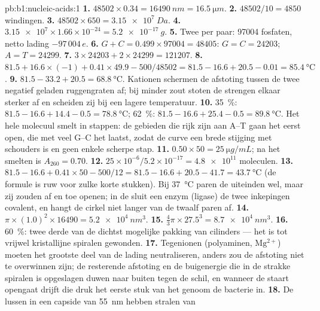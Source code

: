 \begin{solution}{pb:b1:nucleic-acids:1}
\textbf{1.} $\num{48502}\times 0.34 = \qty{16490}{nm} = \qty{16.5}{\micro m}$.
\textbf{2.} $\num{48502}/10 = 4850$ windingen.
\textbf{3.} $\num{48502}\times 650 = \qty{3.15e7}{Da}$.
\textbf{4.} $\num{3.15e7}\times 1.66\times 10^{-24} = \qty{5.2e-17}{g}$.
\textbf{5.} Twee per paar: \num{97004} fosfaten, netto lading $-97\,004\,e$.
\textbf{6.} $G + C = 0.499\times\num{97004} = \num{48405}$: $G = C =
\num{24203}$; $A = T = \num{24299}$.
\textbf{7.} $3\times\num{24203} + 2\times\num{24299} = \num{121207}$.
\textbf{8.} $81.5 + 16.6\times(-1) + 0.41\times 49.9 - 500/48502 =
81.5 - 16.6 + 20.5 - 0.01 = \qty{85.4}{\celsius}$.
\textbf{9.} $81.5 - 33.2 + 20.5 = \qty{68.8}{\celsius}$. Kationen schermen de
afstoting tussen de twee negatief geladen ruggengraten af; bij minder zout stoten
de strengen elkaar sterker af en scheiden zij bij een lagere temperatuur.
\textbf{10.} \qty{35}{\%}: $81.5 - 16.6 + 14.4 - 0.5 =
\qty{78.8}{\celsius}$; \qty{62}{\%}: $81.5 - 16.6 + 25.4 - 0.5 =
\qty{89.8}{\celsius}$. Het hele molecuul smelt in stappen: de gebieden die rijk
zijn aan A--T gaan het eerst open, die met veel G--C het laatst, zodat de curve
een brede stijging met schouders is en geen enkele scherpe stap.
\textbf{11.} $0.50\times 50 = \qty{25}{\micro g/mL}$; na het smelten is
$A_{260} = 0.70$.
\textbf{12.} $25\times 10^{-6}/5.2\times 10^{-17} = \num{4.8e11}$ moleculen.
\textbf{13.} $81.5 - 16.6 + 0.41\times 50 - 500/12 = 81.5 - 16.6 + 20.5
- 41.7 = \qty{43.7}{\celsius}$ (de formule is ruw voor zulke korte stukken). Bij
\qty{37}{\celsius} paren de uiteinden wel, maar zij zouden af en toe openen; in de
 sluit een enzym (ligase) de twee inkepingen covalent, en hangt de cirkel niet
langer van de twaalf paren af.
\textbf{14.} $\pi\times(1.0)^2\times\num{16490} = \qty{5.2e4}{nm^3}$.
\textbf{15.} $\frac{4}{3}\pi\times 27.5^3 = \qty{8.7e4}{nm^3}$.
\textbf{16.} \qty{60}{\%}: twee derde van de dichtst mogelijke pakking van
cilinders --- het  is tot vrijwel kristallijne spiralen gewonden.
\textbf{17.} Tegenionen (polyaminen, $\mathrm{Mg^{2+}}$) moeten het grootste deel
van de lading neutraliseren, anders zou de afstoting niet te overwinnen zijn; de
resterende afstoting en de buigenergie die in de strakke spiralen is opgeslagen
duwen naar buiten tegen de schil, en wanneer de staart opengaat drijft die druk
het eerste stuk van het genoom de bacterie in.
\textbf{18.} De lussen in een capside van \qty{55}{nm} hebben stralen van

\end{solution}
